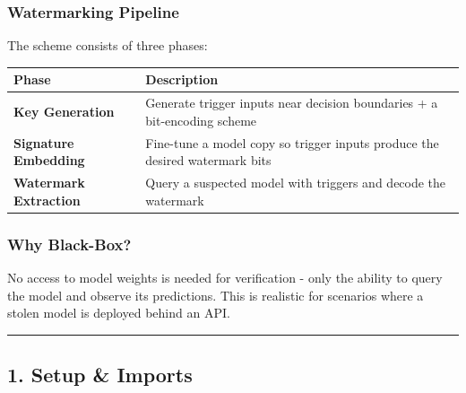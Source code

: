 \documentclass[11pt]{article}
\begin{document}
\subsubsection{Watermarking Pipeline}\label{watermarking-pipeline}

The scheme consists of three phases:

{\def\LTcaptype{none} %
\begin{longtable}[]{@{}
  >{\raggedright\arraybackslash}p{}
  >{\raggedright\arraybackslash}p{}@{}}
\toprule\noalign{}
\begin{minipage}[b]{\linewidth}\raggedright
Phase
\end{minipage} & \begin{minipage}[b]{\linewidth}\raggedright
Description
\end{minipage} \\
\midrule\noalign{}
\endhead
\bottomrule\noalign{}
\endlastfoot
\textbf{Key Generation} & Generate trigger inputs near decision
boundaries + a bit-encoding scheme \\
\textbf{Signature Embedding} & Fine-tune a model copy so trigger inputs
produce the desired watermark bits \\
\textbf{Watermark Extraction} & Query a suspected model with triggers
and decode the watermark \\
\end{longtable}
}

\subsubsection{Why Black-Box?}\label{why-black-box}

No access to model weights is needed for verification - only the ability
to query the model and observe its predictions. This is realistic for
scenarios where a stolen model is deployed behind an API.

\begin{center}\rule{0.5\linewidth}{0.5pt}\end{center}

    \subsection{1. Setup \& Imports}\label{setup-imports}
\end{document}
